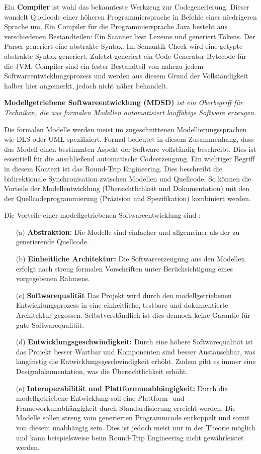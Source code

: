 Ein \textbf{Compiler} ist wohl das bekannteste Werkzeug zur Codegenerierung. Dieser wandelt Quellcode einer höheren Programmiersprache in Befehle einer niedrigeren Sprache um.
Ein Compiler für die Programmiersprache Java besteht aus verschiedenen Bestandteilen: Ein Scanner liest Lexeme und generiert Tokens. Der Parser generiert eine abstrakte Syntax. Im Semantik-Check wird eine getypte abstrakte Syntax generiert. Zuletzt generiert ein Code-Generator Bytecode für die JVM. Compiler sind ein fester Bestandteil von nahezu jedem Softwareentwicklungsprozess und werden aus diesem Grund der Vollständigkeit halber hier angemerkt, jedoch nicht näher behandelt.

\textbf{Modellgetriebene Softwareentwicklung (MDSD)} \textit{ist ein Oberbegriff für Techniken, die aus formalen Modellen automatisiert lauffähige Software erzeugen.} \cite[p.~11]{StahlVoelterEtAl07}

Die formalen Modelle werden meist im zugeschnittenen Modellierungssprachen wie DLS oder UML spezifiziert. Formal bedeutet in diesem Zusammenhang, dass das Modell einen bestimmten Aspekt der Software vollständig beschreibt. Dies ist essentiell für die anschließend automatische Codeerzeugung.
Ein wichtiger Begriff in diesem Kontext ist das Round-Trip Engineering. Dies beschreibt die bidirektionale Synchronisation zwischen Modellen und Quellcode. So können die Vorteile der Modellentwicklung (Übersichtlichkeit und Dokumentation) mit den der Quellcodeprogrammierung (Präzision und Spezifikation) kombiniert werden.

Die Vorteile einer modellgetriebenen Softwareentwicklung sind \cite[p.~13-16]{StahlVoelterEtAl07}:
\begin{itemize}
	\item[(a)] \textbf{Abstraktion:} Die Modelle sind einfacher und allgemeiner als der zu generierende Quellcode.
	\item[(b)] \textbf{Einheitliche Architektur:} Die Softwareerzeugung aus den Modellen erfolgt nach streng formalen Vorschriften unter Berücksichtigung eines vorgegebenen Rahmens. 
	\item[(c)] \textbf{Softwarequalität}
	Das Projekt wird durch den modellgetriebenen Entwicklungsprozess in eine einheitliche, testbare und dokumentierte Architektur gegossen. Selbstverständlich ist dies dennoch keine Garantie für gute Softwarequalität.
	\item[(d)] \textbf{Entwicklungsgeschwindigkeit:}  Durch eine höhere Softwarequalität ist das Projekt besser Wartbar und Komponenten sind besser Austauschbar, was langfristig die Entwicklungsgeschwindigkeit erhöht. Zudem gibt es immer eine Designdokumentation, was die Übersichtlichkeit erhöht.
	\item[(e)] \textbf{Interoperabilität und Plattformunabhängigkeit:} Durch die modellgetriebene Entwicklung soll eine Plattform- und Frameworkunabhängigkeit durch Standardisierung erreicht werden. Die Modelle sollen streng vom generierten Programmcode entkoppelt und somit von diesem unabhängig sein. Dies ist jedoch meist nur in der Theorie möglich und kann beispielsweise beim Round-Trip Engineering nicht gewährleistet werden.
\end{itemize}

